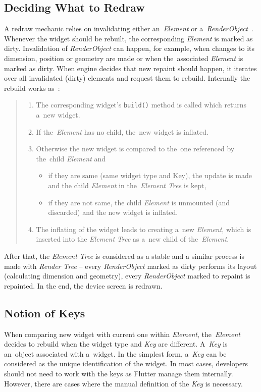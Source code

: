\subsection{Deciding What to Redraw}
A redraw mechanic relies on invalidating either an~\textit{Element} or a~\textit{RenderObject}~\cite{didier-internals}. Whenever the widget should be rebuilt, the corresponding \textit{Element} is marked as dirty. Invalidation of \textit{RenderObject} can happen, for example, when changes to its dimension, position or geometry are made or when the~associated \textit{Element} is marked as dirty. When engine decides that new repaint should happen, it iterates over all invalidated (dirty) elements and request them to rebuild. Internally the rebuild works as~\cite{didier-internals}:
\begin{quote}
    \begin{enumerate}
    \item The corresponding widget's \verb|build()| method is called which returns a~new widget.
    \item If the~\textit{Element} has no child, the~new widget is inflated.
    \item Otherwise the new widget is compared to the~one referenced by the~child \textit{Element} and
        \begin{itemize}
        \item if they are same (same widget type and Key), the update is made and the child \textit{Element} in the~\textit{Element Tree} is kept,
        \item if they are not same, the child \textit{Element} is unmounted (and discarded) and the new widget is inflated.
        \end{itemize}
    \item The inflating of the widget leads to creating a~new \textit{Element}, which is inserted into the \textit{Element Tree} as a~new child of the~\textit{Element}. 
    \end{enumerate}
\end{quote}

After that, the \textit{Element Tree} is considered as a stable and a similar process is made with \textit{Render Tree} -- every \textit{RenderObject} marked as dirty performs its layout (calculating dimension and geometry), every \textit{RenderObject} marked to repaint is repainted. In the end, the device screen is redrawn. 
\subsection{Notion of Keys}
When comparing new widget with current one within \textit{Element}, the~\textit{Element} decides to rebuild when the widget type and \textit{Key} are different. A~\textit{Key} is an~object associated with a~widget. In the simplest form, a~\textit{Key} can be considered as the unique identification of the widget. In most cases, developers should not need to work with the keys as Flutter manage them internally. However, there are cases where the manual definition of the \textit{Key} is necessary. 


